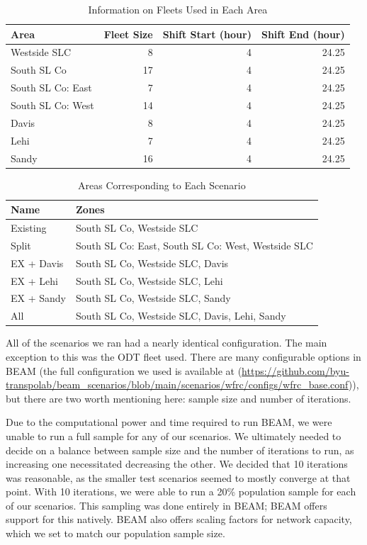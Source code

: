 \documentclass[
]{report}
\begin{document}
\begin{table}

\caption{\label{tab:zone-fleets}Information on Fleets Used in Each Area}
\centering
\begin{tabular}[t]{lrrr}
\toprule
Area & Fleet Size & Shift Start (hour) & Shift End (hour)\\
\midrule
Westside SLC & 8 & 4 & 24.25\\
South SL Co & 17 & 4 & 24.25\\
South SL Co: East & 7 & 4 & 24.25\\
South SL Co: West & 14 & 4 & 24.25\\
Davis & 8 & 4 & 24.25\\
Lehi & 7 & 4 & 24.25\\
Sandy & 16 & 4 & 24.25\\
\bottomrule
\end{tabular}
\end{table}

\begin{table}

\caption{\label{tab:scenarios-info}Areas Corresponding to Each Scenario}
\centering
\begin{tabular}[t]{ll}
\toprule
Name & Zones\\
\midrule
Existing & South SL Co, Westside SLC\\
Split & South SL Co: East, South SL Co: West, Westside SLC\\
EX + Davis & South SL Co, Westside SLC, Davis\\
EX + Lehi & South SL Co, Westside SLC, Lehi\\
EX + Sandy & South SL Co, Westside SLC, Sandy\\
All & South SL Co, Westside SLC, Davis, Lehi, Sandy\\
\bottomrule
\end{tabular}
\end{table}

All of the scenarios we ran had a nearly identical configuration. The main exception to this was the ODT fleet used. There are many configurable options in BEAM (the full configuration we used is available at (\url{https://github.com/byu-transpolab/beam_scenarios/blob/main/scenarios/wfrc/configs/wfrc_base.conf})), but there are two worth mentioning here: sample size and number of iterations.

Due to the computational power and time required to run BEAM, we were unable to run a full sample for any of our scenarios. We ultimately needed to decide on a balance between sample size and the number of iterations to run, as increasing one necessitated decreasing the other. We decided that 10 iterations was reasonable, as the smaller test scenarios seemed to mostly converge at that point. With 10 iterations, we were able to run a 20\% population sample for each of our scenarios. This sampling was done entirely in BEAM; BEAM offers support for this natively. BEAM also offers scaling factors for network capacity, which we set to match our population sample size.
\end{document}
